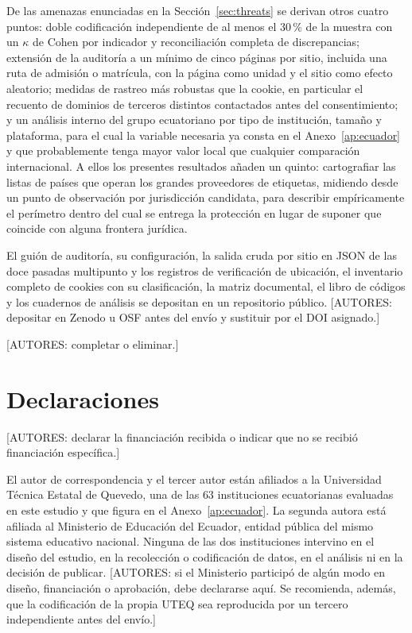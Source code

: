 \documentclass[pdflatex,sn-basic,Numbered]{sn-jnl}
\theoremstyle{thmstyleone}
\theoremstyle{thmstyletwo}
\theoremstyle{thmstylethree}
\begin{document}
De las amenazas enunciadas en la Secci\'on~\ref{sec:threats} se derivan otros cuatro puntos: doble codificaci\'on independiente de al menos el 30\,\% de la muestra con un $\kappa$ de Cohen por indicador y reconciliaci\'on completa de discrepancias; extensi\'on de la auditor\'ia a un m\'inimo de cinco p\'aginas por sitio, incluida una ruta de admisi\'on o matr\'icula, con la p\'agina como unidad y el sitio como efecto aleatorio; medidas de rastreo m\'as robustas que la cookie, en particular el recuento de dominios de terceros distintos contactados antes del consentimiento; y un an\'alisis interno del grupo ecuatoriano por tipo de instituci\'on, tama\~no y plataforma, para el cual la variable necesaria ya consta en el Anexo~\ref{ap:ecuador} y que probablemente tenga mayor valor local que cualquier comparaci\'on internacional. A ellos los presentes resultados a\~naden un quinto: cartografiar las listas de pa\'ises que operan los grandes proveedores de etiquetas, midiendo desde un punto de observaci\'on por jurisdicci\'on candidata, para describir emp\'iricamente el per\'imetro dentro del cual se entrega la protecci\'on en lugar de suponer que coincide con alguna frontera jur\'idica.

\backmatter

El gui\'on de auditor\'ia, su configuraci\'on, la salida cruda por sitio en JSON de las doce pasadas multipunto y los registros de verificaci\'on de ubicaci\'on, el inventario completo de cookies con su clasificaci\'on, la matriz documental, el libro de c\'odigos y los cuadernos de an\'alisis se depositan en un repositorio p\'ublico. \textcolor{gris}{[AUTORES: depositar en Zenodo u OSF antes del env\'io y sustituir por el DOI asignado.]}

\textcolor{gris}{[AUTORES: completar o eliminar.]}

\section*{Declaraciones}

\textcolor{gris}{[AUTORES: declarar la financiaci\'on recibida o indicar que no se recibi\'o financiaci\'on espec\'ifica.]}

El autor de correspondencia y el tercer autor est\'an afiliados a la Universidad T\'ecnica Estatal de Quevedo, una de las 63 instituciones ecuatorianas evaluadas en este estudio y que figura en el Anexo~\ref{ap:ecuador}. La segunda autora est\'a afiliada al Ministerio de Educaci\'on del Ecuador, entidad p\'ublica del mismo sistema educativo nacional. Ninguna de las dos instituciones intervino en el dise\~no del estudio, en la recolecci\'on o codificaci\'on de datos, en el an\'alisis ni en la decisi\'on de publicar. \textcolor{gris}{[AUTORES: si el Ministerio particip\'o de alg\'un modo en dise\~no, financiaci\'on o aprobaci\'on, debe declararse aqu\'i. Se recomienda, adem\'as, que la codificaci\'on de la propia UTEQ sea reproducida por un tercero independiente antes del env\'io.]}
\end{document}
